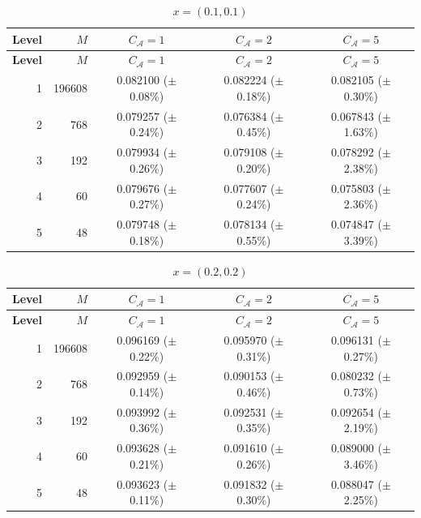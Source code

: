 \documentclass[11pt]{article}
\theoremstyle{definition}
\theoremstyle{plain}
\begin{document}
\begin{appendices}
\begin{longtable}{@{}r r c c c@{}}
\caption{$x=(0.1,0.1)$}\label{tab:mlp-x01}\\
\toprule
\textbf{Level} & \textbf{$M$} & \textbf{$C_{\mathcal A}=1$} & \textbf{$C_{\mathcal A}=2$} & \textbf{$C_{\mathcal A}=5$} \\
\midrule
\endfirsthead
\toprule
\textbf{Level} & \textbf{$M$} & \textbf{$C_{\mathcal A}=1$} & \textbf{$C_{\mathcal A}=2$} & \textbf{$C_{\mathcal A}=5$} \\
\midrule
\endhead
1 & 196608 & 0.082100 (\(\pm\) 0.08\%) & 0.082224 (\(\pm\) 0.18\%) & 0.082105 (\(\pm\) 0.30\%) \\
2 & 768    & 0.079257 (\(\pm\) 0.24\%) & 0.076384 (\(\pm\) 0.45\%) & 0.067843 (\(\pm\) 1.63\%) \\
3 & 192    & 0.079934 (\(\pm\) 0.26\%) & 0.079108 (\(\pm\) 0.20\%) & 0.078292 (\(\pm\) 2.38\%) \\
4 & 60     & 0.079676 (\(\pm\) 0.27\%) & 0.077607 (\(\pm\) 0.24\%) & 0.075803 (\(\pm\) 2.36\%) \\
5 & 48     & 0.079748 (\(\pm\) 0.18\%) & 0.078134 (\(\pm\) 0.55\%) & 0.074847 (\(\pm\) 3.39\%) \\
\bottomrule
\end{longtable}

\begin{longtable}{@{}r r c c c@{}}
\caption{$x=(0.2,0.2)$}\label{tab:mlp-x02}\\
\toprule
\textbf{Level} & \textbf{$M$} & \textbf{$C_{\mathcal A}=1$} & \textbf{$C_{\mathcal A}=2$} & \textbf{$C_{\mathcal A}=5$} \\
\midrule
\endfirsthead
\toprule
\textbf{Level} & \textbf{$M$} & \textbf{$C_{\mathcal A}=1$} & \textbf{$C_{\mathcal A}=2$} & \textbf{$C_{\mathcal A}=5$} \\
\midrule
\endhead
1 & 196608 & 0.096169 (\(\pm\) 0.22\%) & 0.095970 (\(\pm\) 0.31\%) & 0.096131 (\(\pm\) 0.27\%) \\
2 & 768    & 0.092959 (\(\pm\) 0.14\%) & 0.090153 (\(\pm\) 0.46\%) & 0.080232 (\(\pm\) 0.73\%) \\
3 & 192    & 0.093992 (\(\pm\) 0.36\%) & 0.092531 (\(\pm\) 0.35\%) & 0.092654 (\(\pm\) 2.19\%) \\
4 & 60     & 0.093628 (\(\pm\) 0.21\%) & 0.091610 (\(\pm\) 0.26\%) & 0.089000 (\(\pm\) 3.46\%) \\
5 & 48     & 0.093623 (\(\pm\) 0.11\%) & 0.091832 (\(\pm\) 0.30\%) & 0.088047 (\(\pm\) 2.25\%) \\
\bottomrule
\end{longtable}


\end{appendices}
\end{document}
